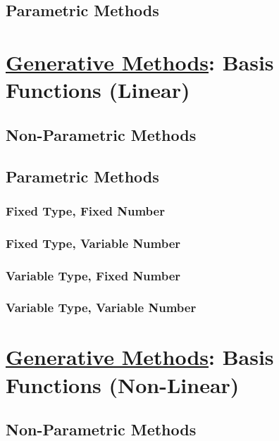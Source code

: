 \documentclass{book}
\begin{document}
\section{Parametric Methods}

\chapter{\underline{Generative Methods}: Basis Functions (Linear)}
\section{Non-Parametric Methods}

\section{Parametric Methods}

\subsection{Fixed Type, Fixed Number}

\subsection{Fixed Type, Variable Number} 

\subsection{Variable Type, Fixed Number} 

\subsection{Variable Type, Variable Number} 


\chapter{\underline{Generative Methods}: Basis Functions (Non-Linear)}
\section{Non-Parametric Methods}
\end{document}

